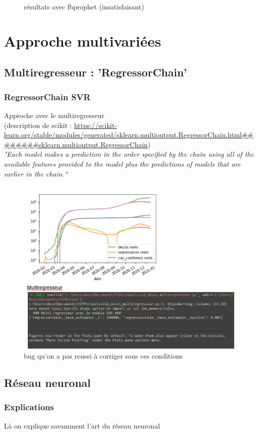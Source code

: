 \documentclass{beamer}
\begin{document}
\begin{frame}
\begin{figure}[t]
\begin{minipage}{0.3\textwidth}
		\end{minipage}
	\caption{résultats avec fbprophet (insatisfaisant)}
	\end{figure}
\end{frame}

\section{Approche multivariées}
\subsection{Multiregresseur : 'RegressorChain'}
\begin{frame}
	\frametitle{RegressorChain SVR}
	Approche avec le multiregresseur\\
	\tiny{(description de scikit : \url{https://scikit-learn.org/stable/modules/generated/sklearn.multioutput.RegressorChain.html########sklearn.multioutput.RegressorChain})}\\
	\normalsize{\textit{"Each model makes a prediction in the order specified by the chain using all of the available features provided to the model plus the predictions of models that are earlier in the chain."}}
	\begin{figure}[h]
		\includegraphics[scale=0.3]{mulitregr_epic_fail}
		\caption{bug qu'on a pas reussi à corriger sous ces conditions}
	\end{figure}
\end{frame}

\subsection{Réseau neuronal}
\begin{frame}
	\frametitle{Explications}
	Là on explique savamment l'art du réseau neuronal
\end{frame}
\end{document}
